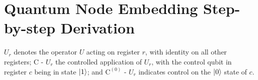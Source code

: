 \documentclass[
  reprint,
  superscriptaddress,
  amsmath,amssymb,
  aps,prl,
]{revtex4-2}
\begin{document}
\section{Quantum Node Embedding Step-by-step Derivation}
\label{appendix:mapping}
\noindent \(U_r\) denotes the operator \(U\) acting on register \(r\), with identity on all other registers; \(\mathrm{C}\text{ - }U_r\) the controlled application of \(U_r\), with the control qubit in register \(c\) being in state \(\ket{1}\); and \(\mathrm{C}^{(0)}\text{ - }U_r\) indicates control on the \(\ket{0}\) state of \(c\).
\newcommand{\zero}[1]{0^{#1}}
\newcommand{\ketzero}[1]{\ket{0^{#1}}}
\newcommand{\rvl}{r(v,\ell_1)}
\newcommand{\rrvll}{r(\mathcal{N}^1_v(\ell_1), \ell_2)}
\newcommand{\garbage}{\ket{\perp}}
\end{document}
